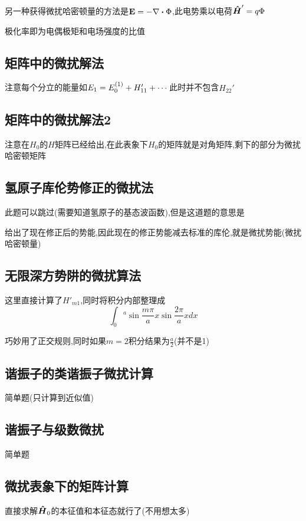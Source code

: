 \documentclass{article}
\begin{document}
            另一种获得微扰哈密顿量的方法是$ \vb{E} = - \nabla \vdot \Phi $,此电势乘以电荷$ \vu*{H}' = q \Phi  $

            极化率即为电偶极矩和电场强度的比值

        \subsection{矩阵中的微扰解法}
            注意每个分立的能量如$E_1 = E_{0}^{(1)} + H_{11}' + \cdots$此时并不包含$H_{22}'$

        \subsection{矩阵中的微扰解法2}
            注意在$H_{0}$的$H$矩阵已经给出,在此表象下$H_{0}$的矩阵就是对角矩阵,剩下的部分为微扰哈密顿矩阵

        \subsection{氢原子库伦势修正的微扰法}
            此题可以跳过(需要知道氢原子的基态波函数),但是这道题的意思是

            给出了现在修正后的势能,因此现在的修正势能减去标准的库伦,就是微扰势能(微扰哈密顿量)
        
        \subsection{无限深方势阱的微扰算法}
            这里直接计算了$H'_{m1}$,同时将积分内部整理成
            $$ \int_{0}{^a} \sin{\frac{m \pi }{a} x} \sin{\frac{2\pi}{a}x} dx $$
            
            巧妙用了正交规则,同时如果$m=2$积分结果为$ \frac{a}{2} $(并不是1)

        \subsection{谐振子的类谐振子微扰计算}
            简单题(只计算到近似值)

        \subsection{谐振子与级数微扰}
            简单题

        \subsection{微扰表象下的矩阵计算}
            直接求解$\vu*{H}_{0}$的本征值和本征态就行了(不用想太多)
\end{document}
